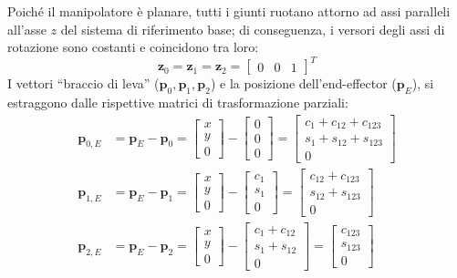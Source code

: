 \documentclass[11pt, a4paper]{report}
\begin{document}
Poiché il manipolatore è planare, tutti i giunti ruotano attorno ad assi paralleli all'asse $z$ del sistema di riferimento base; di conseguenza, i versori degli assi di rotazione sono costanti e coincidono tra loro:
\[
    \bm{z}_0 = \bm{z}_1 = \bm{z}_2 = \begin{bmatrix} 0 & 0 & 1 \end{bmatrix}^T
\]
\newpage
I vettori ``braccio di leva'' ($\bm{p}_0, \bm{p}_1, \bm{p}_2$) e la posizione dell'end-effector ($\bm{p}_E$), si estraggono dalle rispettive matrici di trasformazione parziali:
\[
\begin{aligned}
    \bm{p}_{0,E} &= \bm{p}_E - \bm{p}_0 = \begin{bmatrix} x \\ y \\ 0 \end{bmatrix} - \begin{bmatrix} 0 \\ 0 \\ 0 \end{bmatrix} = \begin{bmatrix} c_1+c_{12}+c_{123} \\ s_1+s_{12}+s_{123} \\ 0 \end{bmatrix} \\
    \bm{p}_{1,E} &= \bm{p}_E - \bm{p}_1 = \begin{bmatrix} x \\ y \\ 0 \end{bmatrix} - \begin{bmatrix} c_1 \\ s_1 \\ 0 \end{bmatrix} = \begin{bmatrix} c_{12}+c_{123} \\ s_{12}+s_{123} \\ 0 \end{bmatrix} \\
    \bm{p}_{2,E} &= \bm{p}_E - \bm{p}_2 = \begin{bmatrix} x \\ y \\ 0 \end{bmatrix} - \begin{bmatrix} c_1+c_{12} \\ s_1+s_{12} \\ 0 \end{bmatrix} = \begin{bmatrix} c_{123} \\ s_{123} \\ 0 \end{bmatrix}
\end{aligned}
\]
\end{document}
